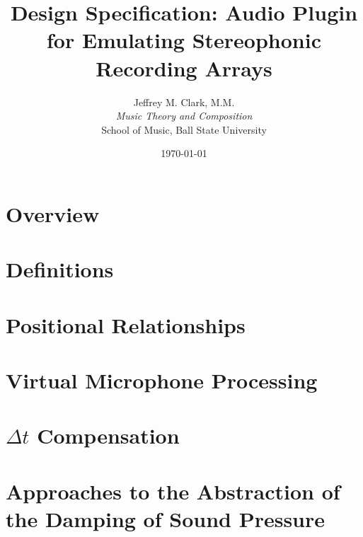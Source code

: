 \documentclass[fleqn, 10pt, letterpaper]{IEEEtran}
\title{Design Specification: Audio Plugin for Emulating Stereophonic Recording Arrays}
\date{\today}
\author{Jeffrey M. Clark, M.M. \\ \textit{Music Theory and Composition} \\ School of Music,  Ball State University}
\begin{document}
\maketitle



\section{Overview}



\section{Definitions}



\section{Positional Relationships}

	

\section{Virtual Microphone Processing}



\section{$\Delta{}t$ Compensation}



\section{Approaches to the Abstraction of the Damping of Sound Pressure}




\nocite{*}


\end{document}
